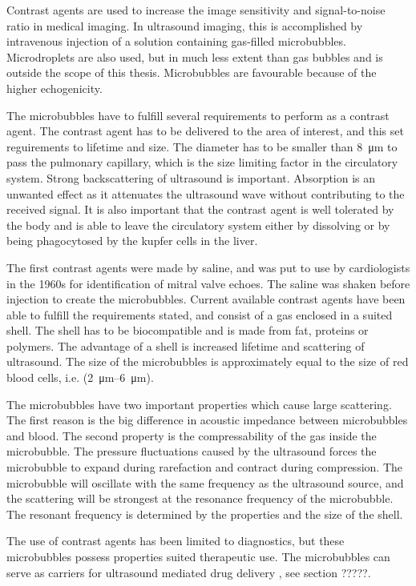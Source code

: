 Contrast agents are used to increase the image sensitivity and signal-to-noise ratio in medical imaging. In ultrasound imaging, this is accomplished by intravenous injection of a solution containing gas-filled microbubbles. Microdroplets are also used\cite{Soman2006}, but in much less extent than gas bubbles and is outside the scope of this thesis. Microbubbles are favourable because of the higher echogenicity\cite{Talu2008}.

The microbubbles have to fulfill several requirements to perform as a contrast agent. The contrast agent has to be delivered to the area of interest, and this set reguirements to lifetime and size. The diameter has to be smaller than \SI{8}{\micro\metre} to pass the pulmonary capillary\cite{Tickner1980}, which is the size limiting factor in the circulatory system. Strong backscattering of ultrasound is important. Absorption is an unwanted effect as it attenuates the ultrasound wave without contributing to the received signal. It is also important that the contrast agent is well tolerated by the body and is able to leave the circulatory system either by dissolving or by being phagocytosed by the kupfer cells in the liver\cite{Healey2012}.

The first contrast agents were made by saline, and was put to use by cardiologists in the 1960s for identification of mitral valve echoes. The saline was shaken before injection to create the microbubbles. Current available contrast agents have been able to fulfill the requirements stated, and consist of a gas enclosed in a suited shell. The shell has to be biocompatible and is made from fat, proteins or polymers. The advantage of a shell is increased lifetime and scattering of ultrasound. The size of the microbubbles is approximately equal to the size of red blood cells, i.e. (\SIrange{2}{6}{\micro\metre}).

The microbubbles have two important properties which cause large scattering. The first reason is the big difference in acoustic impedance between microbubbles and blood. The second property is the compressability of the gas inside the microbubble. The pressure fluctuations caused by the ultrasound forces the microbubble to expand during rarefaction and contract during compression. The microbubble will oscillate with the same frequency as the ultrasound source, and the scattering will be strongest at the resonance frequency of the microbubble. The resonant frequency is determined by the properties and the size of the shell.

The use of contrast agents has been limited to diagnostics, but these microbubbles possess properties suited therapeutic use. The microbubbles can serve as carriers for ultrasound mediated drug delivery \cite{Dijkmans2004}, see section ?????. 


